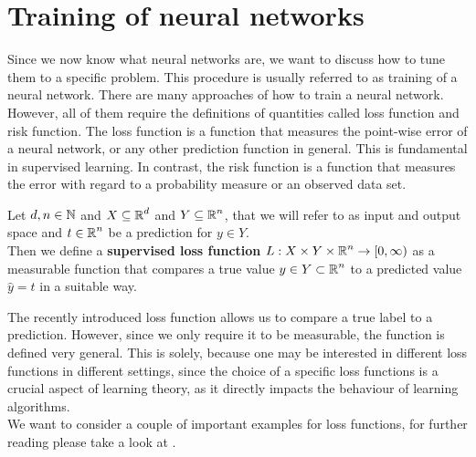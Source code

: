 \section{Training of neural networks}

Since we now know what neural networks are, we want to discuss how to tune them to a specific problem. This procedure is usually referred to as training of a neural network. There are many approaches of how to train a neural network. However, all of them require the definitions of quantities called loss function and risk function. The loss function is a function that measures the point-wise error of a neural network, or any other prediction function in general. This is fundamental in supervised learning. In contrast, the risk function is a function that measures the error with regard to a probability measure or an observed data set.


\begin{definition}\label{def_loss}
Let $d, n \in \operatorname{\mathbb{N}}$ and $X\subseteq \operatorname{\mathbb{R}}^d$ and $Y \subseteq \operatorname{\mathbb{R}}^n$, that we will refer to as input and output space and $t\in\operatorname{\mathbb{R}}^n$ be a prediction for $y\in Y$.\\
Then we define a \textbf{supervised loss function} $L: X \times Y \times \operatorname{\mathbb{R}}^n \to [0, \infty)$ as a measurable function that compares a true value $y \in Y \subset \operatorname{\mathbb{R}}^n$ to a predicted value $\hat{y} = t$ in a suitable way.
\end{definition}

The recently introduced loss function allows us to compare a true label to a prediction. However, since we only require it to be measurable, the function is defined very general. This is solely, because one may be interested in different loss functions in different settings, since the choice of a specific loss functions is a crucial aspect of learning theory, as it directly impacts the behaviour of learning algorithms.\\
We want to consider a couple of important examples for loss functions, for further reading please take a look at \cite[chapter~4.3]{goodfellow2016deep}.


